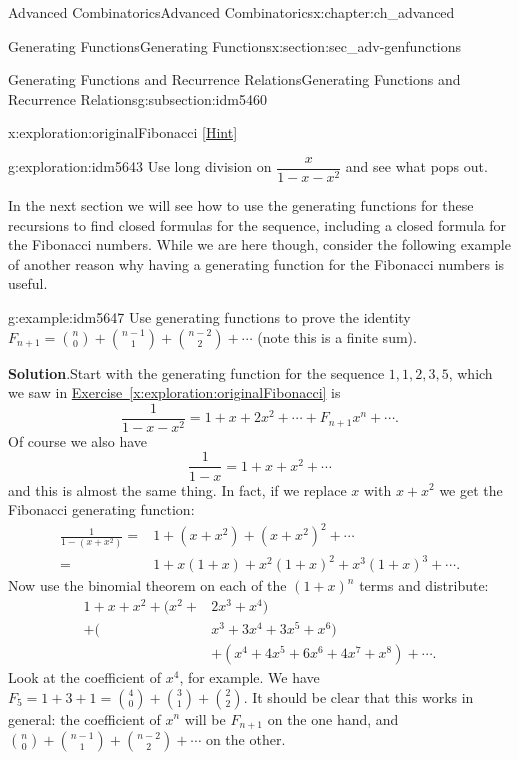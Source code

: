 \documentclass[oneside,10pt,]{book}
\numberwithin{equation}{chapter}
\newcommand{\amp}{&}
\begin{document}
\begin{chapterptx}{Advanced Combinatorics}{}{Advanced Combinatorics}{}{}{x:chapter:ch_advanced}
\begin{sectionptx}{Generating Functions}{}{Generating Functions}{}{}{x:section:sec_adv-genfunctions}
\begin{subsectionptx}{Generating Functions and Recurrence Relations}{}{Generating Functions and Recurrence Relations}{}{}{g:subsection:idm5460}
\begin{exploration}{}{x:exploration:originalFibonacci}
\space\hspace*{0pt}\hfill{\tiny\hyperlink{g:hint:idm5629-back}{[Hint]}}\end{exploration}
\begin{exploration}{}{g:exploration:idm5643}%
Use long division on \(\dfrac{x}{1-x-x^2}\) and see what pops out.%
\end{exploration}
In the next section we will see how to use the generating functions for these recursions to find closed formulas for the sequence, including a closed formula for the Fibonacci numbers.  While we are here though, consider the following example of another reason why having a generating function for the Fibonacci numbers is useful.%
\begin{example}{}{g:example:idm5647}%
Use generating functions to prove the identity \(F_{n+1} = \binom{n}{0} + \binom{n-1}{1} + \binom{n-2}{2} + \cdots \) (note this is a finite sum).%
\par\smallskip%
\noindent\textbf{Solution}.\hypertarget{g:solution:idm5651}{}\quad{}Start with the generating function for the sequence \(1, 1, 2, 3, 5\), which we saw in \hyperref[x:exploration:originalFibonacci]{Exercise~\ref{x:exploration:originalFibonacci}} is%
\begin{equation*}
\frac{1}{1-x-x^2} = 1 + x + 2x^2 + \cdots + F_{n+1}x^n+ \cdots\text{.}
\end{equation*}
Of course we also have%
\begin{equation*}
\frac{1}{1-x} = 1 + x + x^2 + \cdots
\end{equation*}
and this is almost the same thing.  In fact, if we replace \(x\) with \(x+x^2\) we get the Fibonacci generating function:%
\begin{align*}
\frac{1}{1-(x+x^2)} = \amp 1 + (x+x^2) + (x+x^2)^2 + \cdots \\
= \amp 1 + x(1+x) + x^2(1+x)^2 + x^3(1+x)^3 + \cdots\text{.}
\end{align*}
Now use the binomial theorem on each of the \((1+x)^n\) terms and distribute:%
\begin{align*}
1 + x + x^2 + (x^2 +\amp 2x^3 + x^4)\\
+ (\amp x^3 + 3x^4 + 3x^5 + x^6)\\
\amp + (x^4 + 4x^5 + 6x^6 + 4x^7 + x^8) + \cdots \text{.}
\end{align*}
Look at the coefficient of \(x^4\), for example.  We have \(F_5 = 1 + 3 + 1 = \binom{4}{0} + \binom{3}{1} + \binom{2}{2}\).  It should be clear that this works in general: the coefficient of \(x^n\) will be \(F_{n+1}\) on the one hand, and \(\binom{n}{0} + \binom{n-1}{1} + \binom{n-2}{2}+ \cdots\) on the other.%

\end{example}
\end{subsectionptx}
\end{sectionptx}
\end{chapterptx}
\end{document}
